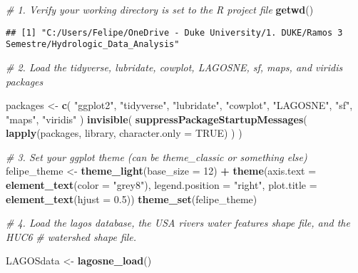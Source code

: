 \documentclass[]{article}
\newenvironment{Shaded}{\begin{snugshade}}{\end{snugshade}}
\newcommand{\CommentTok}[1]{\textcolor[rgb]{0.56,0.35,0.01}{\textit{#1}}}
\newcommand{\DataTypeTok}[1]{\textcolor[rgb]{0.13,0.29,0.53}{#1}}
\newcommand{\DecValTok}[1]{\textcolor[rgb]{0.00,0.00,0.81}{#1}}
\newcommand{\FloatTok}[1]{\textcolor[rgb]{0.00,0.00,0.81}{#1}}
\newcommand{\KeywordTok}[1]{\textcolor[rgb]{0.13,0.29,0.53}{\textbf{#1}}}
\newcommand{\NormalTok}[1]{#1}
\newcommand{\OperatorTok}[1]{\textcolor[rgb]{0.81,0.36,0.00}{\textbf{#1}}}
\newcommand{\OtherTok}[1]{\textcolor[rgb]{0.56,0.35,0.01}{#1}}
\newcommand{\StringTok}[1]{\textcolor[rgb]{0.31,0.60,0.02}{#1}}
\begin{document}
\begin{Shaded}
\begin{Highlighting}[]
\CommentTok{# 1. Verify your working directory is set to the R project file}
\KeywordTok{getwd}\NormalTok{()}
\end{Highlighting}
\end{Shaded}

\begin{verbatim}
## [1] "C:/Users/Felipe/OneDrive - Duke University/1. DUKE/Ramos 3 Semestre/Hydrologic_Data_Analysis"
\end{verbatim}

\begin{Shaded}
\begin{Highlighting}[]
\CommentTok{# 2. Load the tidyverse, lubridate, cowplot, LAGOSNE, sf, maps, and viridis packages }

\NormalTok{packages <-}\StringTok{ }\KeywordTok{c}\NormalTok{(}
  \StringTok{"ggplot2"}\NormalTok{, }
  \StringTok{"tidyverse"}\NormalTok{, }
  \StringTok{"lubridate"}\NormalTok{, }
  \StringTok{"cowplot"}\NormalTok{,}
  \StringTok{"LAGOSNE"}\NormalTok{,}
  \StringTok{"sf"}\NormalTok{,}
  \StringTok{"maps"}\NormalTok{,}
  \StringTok{"viridis"}
\NormalTok{  )}
\KeywordTok{invisible}\NormalTok{(}
  \KeywordTok{suppressPackageStartupMessages}\NormalTok{(}
    \KeywordTok{lapply}\NormalTok{(packages, library, }\DataTypeTok{character.only =} \OtherTok{TRUE}\NormalTok{)}
\NormalTok{    )}
\NormalTok{  ) }

\CommentTok{# 3. Set your ggplot theme (can be theme_classic or something else)}
\NormalTok{felipe_theme <-}\StringTok{ }\KeywordTok{theme_light}\NormalTok{(}\DataTypeTok{base_size =} \DecValTok{12}\NormalTok{) }\OperatorTok{+}
\StringTok{  }\KeywordTok{theme}\NormalTok{(}\DataTypeTok{axis.text =} \KeywordTok{element_text}\NormalTok{(}\DataTypeTok{color =} \StringTok{"grey8"}\NormalTok{), }
        \DataTypeTok{legend.position =} \StringTok{"right"}\NormalTok{, }\DataTypeTok{plot.title =} \KeywordTok{element_text}\NormalTok{(}\DataTypeTok{hjust =} \FloatTok{0.5}\NormalTok{)) }
\KeywordTok{theme_set}\NormalTok{(felipe_theme)}

\CommentTok{# 4. Load the lagos database, the USA rivers water features shape file, and the HUC6}
\CommentTok{# watershed shape file.}

\NormalTok{LAGOSdata <-}\StringTok{ }\KeywordTok{lagosne_load}\NormalTok{()}
\end{Highlighting}
\end{Shaded}
\end{document}
